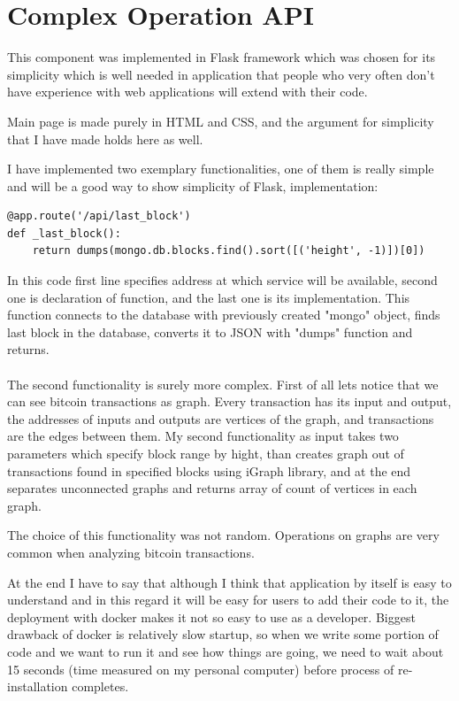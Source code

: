 \documentclass[12pt, en, eng, oneside]{mgr}
\begin{document}
\section{Complex Operation API}
This component was implemented in Flask framework which was chosen for its simplicity which is well needed in application that people who very often don't have experience with web applications will extend with their code. 

Main page is made purely in HTML and CSS, and the argument for simplicity that I have made holds here as well.

I have implemented two exemplary functionalities, one of them is really simple and will be a good way to show simplicity of Flask, implementation:
\begin{verbatim}
@app.route('/api/last_block')
def _last_block():
    return dumps(mongo.db.blocks.find().sort([('height', -1)])[0])
\end{verbatim}
In this code first line specifies address at which service will be available, second one is declaration of function, and the last one is its implementation. This function connects to the database with previously created "mongo" object, finds last block in the database, converts it to JSON with "dumps" function and returns.
\\
\\
The second functionality is surely more complex. First of all lets notice that we can see bitcoin transactions as graph. Every transaction has its input and output, the addresses of inputs and outputs are vertices of the graph, and transactions are the edges between them. My second functionality as input takes two parameters which specify block range by hight, than creates graph out of transactions found in specified blocks using iGraph library, and at the end separates unconnected graphs and returns array of count of vertices in each graph.

The choice of this functionality was not random. Operations on graphs are very common when analyzing bitcoin transactions.

At the end I have to say that although I think that application by itself is easy to understand and in this regard it will be easy for users to add their code to it, the deployment with docker makes it not so easy to use as a developer. Biggest drawback of docker is relatively slow startup, so when we write some portion of code and we want to run it and see how things are going, we need to wait about 15 seconds (time measured on my personal computer) before process of re-installation completes.
\end{document}
